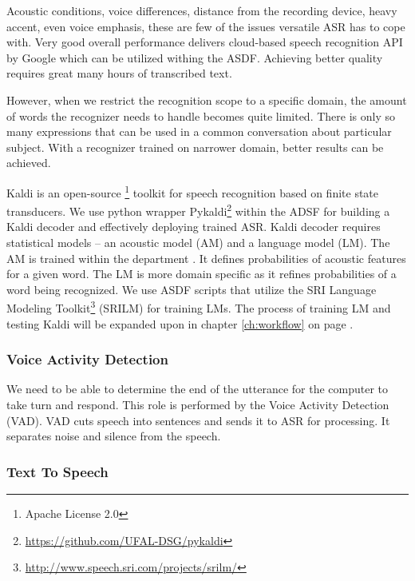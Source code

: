 Acoustic conditions, voice differences, distance from the recording device, heavy accent, even voice emphasis, these are few of the issues versatile ASR has to cope with.
Very good overall performance delivers cloud-based speech recognition API by Google which can be utilized withing the ASDF.
Achieving better quality requires great many hours of transcribed text.

However, when we restrict the recognition scope to a specific domain, the amount of words the recognizer needs to handle becomes quite limited.
There is only so many expressions that can be used in a common conversation about particular subject.
With a recognizer trained on narrower domain, better results can be achieved.


Kaldi is an open-source \footnote{Apache License 2.0} toolkit for speech recognition based on finite state transducers.
We use python wrapper Pykaldi\footnote{\url{https://github.com/UFAL-DSG/pykaldi}} within the ADSF for building a Kaldi decoder and effectively deploying trained ASR.
Kaldi decoder requires statistical models -- an acoustic model (AM) and a language model (LM).
The AM is trained within the department \cite{oplatek}.
It defines probabilities of acoustic features for a given word.
The LM is more domain specific as it refines probabilities of a word being recognized.
We use ASDF scripts that utilize the SRI Language Modeling Toolkit\footnote{\url{http://www.speech.sri.com/projects/srilm/}} (SRILM) for training LMs.
The process of training LM and testing Kaldi will be expanded upon in chapter \ref{ch:workflow} on page \pageref{ch:workflow}.

\subsubsection{Voice Activity Detection}

We need to be able to determine the end of the utterance for the computer to take turn and respond.
This role is performed by the Voice Activity Detection (VAD).
VAD cuts speech into sentences and sends it to ASR for processing.
It separates noise and silence from the speech.

\subsubsection{Text To Speech}

